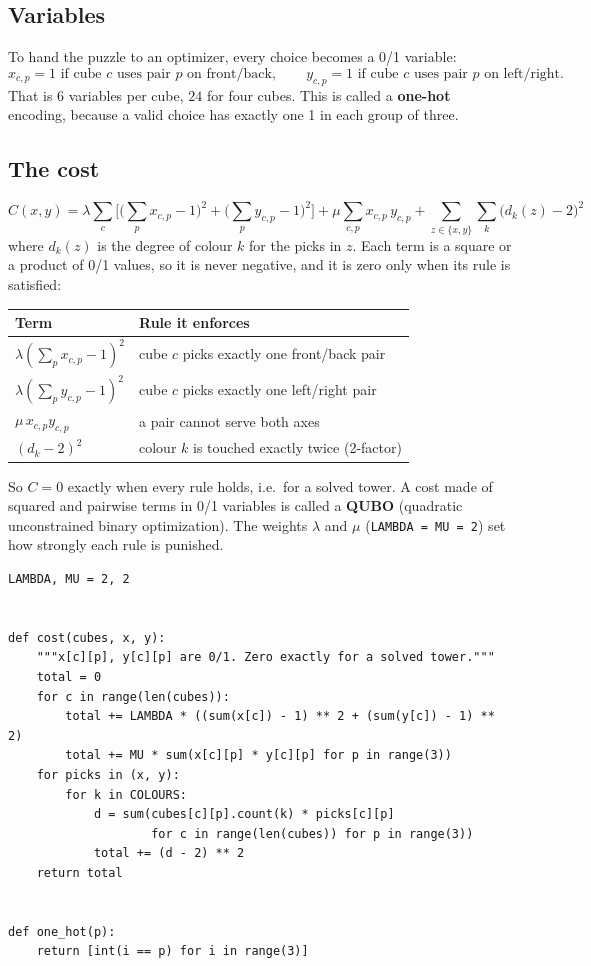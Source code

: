 \documentclass[11pt]{article}
\newcommand{\code}[1]{\texttt{#1}}
\begin{document}
\subsection{Variables}

To hand the puzzle to an optimizer, every choice becomes a 0/1 variable:
\[
x_{c,p} = 1 \text{ if cube } c \text{ uses pair } p \text{ on front/back},\qquad
y_{c,p} = 1 \text{ if cube } c \text{ uses pair } p \text{ on left/right}.
\]
That is $6$ variables per cube, $24$ for four cubes. This is called a
\textbf{one-hot} encoding, because a valid choice has exactly one 1 in each
group of three.

\subsection{The cost}

\[
C(x,y) = \lambda \sum_c \Big[\big(\textstyle\sum_p x_{c,p} - 1\big)^2
       + \big(\sum_p y_{c,p} - 1\big)^2\Big]
     + \mu \sum_{c,p} x_{c,p}\, y_{c,p}
     + \sum_{z \in \{x,y\}} \sum_{k} \big(d_k(z) - 2\big)^2
\]
where $d_k(z)$ is the degree of colour $k$ for the picks in $z$. Each term is a
square or a product of 0/1 values, so it is never negative, and it is zero only
when its rule is satisfied:

\begin{center}
\begin{tabular}{ll}
\toprule
Term & Rule it enforces \\
\midrule
$\lambda(\sum_p x_{c,p} - 1)^2$ & cube $c$ picks exactly one front/back pair \\
$\lambda(\sum_p y_{c,p} - 1)^2$ & cube $c$ picks exactly one left/right pair \\
$\mu\, x_{c,p} y_{c,p}$ & a pair cannot serve both axes \\
$(d_k - 2)^2$ & colour $k$ is touched exactly twice (2-factor) \\
\bottomrule
\end{tabular}
\end{center}

So $C = 0$ exactly when every rule holds, i.e.\ for a solved tower. A cost made
of squared and pairwise terms in 0/1 variables is called a \textbf{QUBO}
(quadratic unconstrained binary optimization). The weights $\lambda$ and $\mu$
(\code{LAMBDA = MU = 2}) set how strongly each rule is punished.

\begin{lstlisting}
LAMBDA, MU = 2, 2


def cost(cubes, x, y):
    """x[c][p], y[c][p] are 0/1. Zero exactly for a solved tower."""
    total = 0
    for c in range(len(cubes)):
        total += LAMBDA * ((sum(x[c]) - 1) ** 2 + (sum(y[c]) - 1) ** 2)
        total += MU * sum(x[c][p] * y[c][p] for p in range(3))
    for picks in (x, y):
        for k in COLOURS:
            d = sum(cubes[c][p].count(k) * picks[c][p]
                    for c in range(len(cubes)) for p in range(3))
            total += (d - 2) ** 2
    return total


def one_hot(p):
    return [int(i == p) for i in range(3)]
\end{lstlisting}
\end{document}
